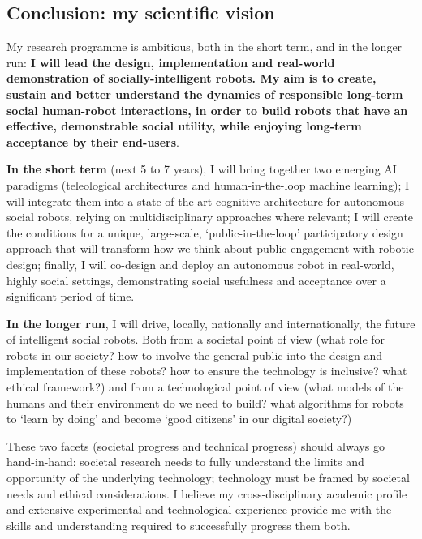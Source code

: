 \subsection{Conclusion: my scientific vision}

My research programme is ambitious, both in the short term, and in the longer
run: \textbf{I will lead the design, implementation and real-world demonstration
of socially-intelligent robots. My aim is to create, sustain and better
understand the dynamics of responsible long-term social human-robot
interactions, in order to build robots that have an effective, demonstrable
social utility, while enjoying long-term acceptance by their end-users}.


\textbf{In the short term} (next 5 to 7 years), I will bring together two emerging AI
paradigms (teleological architectures and human-in-the-loop machine learning); I
will integrate them into a state-of-the-art cognitive architecture for
autonomous social robots, relying on multidisciplinary approaches where
relevant; I will create the conditions for a unique, large-scale,
`public-in-the-loop' participatory design approach that will transform how we
think about public engagement with robotic design; finally, I will co-design
and deploy an autonomous robot in real-world, highly social settings,
demonstrating social usefulness and acceptance over a significant period of
time.

\textbf{In the longer run}, I will drive, locally, nationally and internationally, the
future of intelligent social robots. Both from a societal point of view (what
role for robots in our society? how to involve the general public into the
design and implementation of these robots?  how to ensure the technology is
inclusive? what ethical framework?) and from a technological point of view (what
models of the humans and their environment do we need to build? what algorithms
for robots to `learn by doing' and become `good citizens' in our digital
society?)

These two facets (societal progress and technical progress) should always go
hand-in-hand: societal research needs to fully understand the limits and
opportunity of the underlying technology; technology must be framed
by societal needs and ethical considerations. I believe my cross-disciplinary
academic profile and extensive experimental and technological experience provide me
with the skills and understanding required to successfully progress them both.

